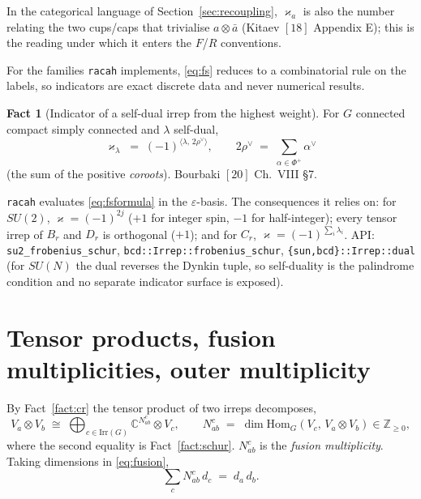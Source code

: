 \documentclass[11pt,a4paper]{article}
\theoremstyle{plain}
\theoremstyle{definition}
\newtheorem{fact}[theorem]{Fact}
\newcommand{\Irr}{\mathrm{Irr}}
\newcommand{\Hom}{\mathrm{Hom}}
\newcommand{\ZZ}{\mathbb{Z}}
\newcommand{\CC}{\mathbb{C}}
\newcommand{\dual}[1]{\bar{#1}}
\newcommand{\code}[1]{\texttt{#1}}
\begin{document}
In the categorical language of Section~\ref{sec:recoupling}, $\varkappa_a$ is
also the number relating the two cups/caps that trivialise $a\otimes\dual a$
(Kitaev $[18]$ Appendix E); this is the reading under which it enters the
$F$/$R$ conventions.

For the families \code{racah} implements, \eqref{eq:fs} reduces to a
combinatorial rule on the labels, so indicators are exact discrete data and
never numerical results.

\begin{fact}[Indicator of a self-dual irrep from the highest weight]
\label{fact:fsformula}
For $G$ connected compact simply connected and $\lambda$ self-dual,
\begin{equation}\label{eq:fsformula}
  \varkappa_\lambda \;=\; (-1)^{\langle \lambda,\, 2\rho^\vee\rangle},
  \qquad
  2\rho^\vee \;=\; \sum_{\alpha\in\Phi^+}\alpha^\vee
\end{equation}
(the sum of the positive \emph{coroots}). Bourbaki $[20]$ Ch.~VIII \S7.
\end{fact}

\code{racah} evaluates \eqref{eq:fsformula} in the $\varepsilon$-basis. The
consequences it relies on: for $SU(2)$, $\varkappa = (-1)^{2j}$ ($+1$ for
integer spin, $-1$ for half-integer); every tensor irrep of $B_r$ and $D_r$ is
orthogonal ($+1$); and for $C_r$, $\varkappa = (-1)^{\sum_i \lambda_i}$.
API: \code{su2\_frobenius\_schur}, \code{bcd::Irrep::frobenius\_schur},
\code{\{sun,bcd\}::Irrep::dual} (for $SU(N)$ the dual reverses the Dynkin
tuple, so self-duality is the palindrome condition and no separate indicator
surface is exposed).

\section{Tensor products, fusion multiplicities, outer multiplicity}
\label{sec:fusion}

By Fact~\ref{fact:cr} the tensor product of two irreps decomposes,
\begin{equation}\label{eq:fusion}
  V_a \otimes V_b \;\cong\; \bigoplus_{c\in\Irr(G)} \CC^{N^c_{ab}} \otimes V_c,
  \qquad
  N^c_{ab} \;=\; \dim \Hom_G(V_c,\, V_a\otimes V_b) \in \ZZ_{\ge 0},
\end{equation}
where the second equality is Fact~\ref{fact:schur}. $N^c_{ab}$ is the
\emph{fusion multiplicity}. Taking dimensions in \eqref{eq:fusion},
\begin{equation}\label{eq:dimcount}
  \sum_c N^c_{ab}\, d_c \;=\; d_a\, d_b .
\end{equation}
\end{document}
